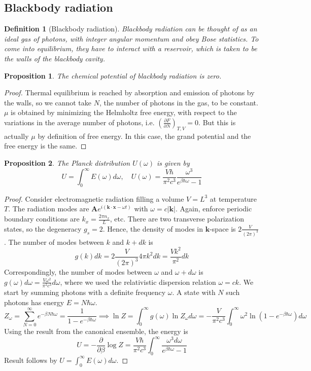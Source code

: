 \documentclass[a4paper]{article}
\theoremstyle{new}
\newtheorem{defi}{Definition}[section]
\newtheorem{prop}{Proposition}[section]
\begin{document}
\subsection{Blackbody radiation}
\begin{defi}[Blackbody radiation]
Blackbody radiation can be thought of as an ideal gas of photons, with integer angular momentum and obey Bose statistics. To come into equilibrium, they have to interact with a reservoir, which is taken to be the walls of the blackbody cavity.
\end{defi}
\begin{prop}
The chemical potential of blackbody radiation is zero.
\end{prop}
\begin{proof}
Thermal equilibrium is reached by absorption and emission of photons by the walls, so we cannot take $N$, the number of photons in the gas, to be constant. $\mu$ is obtained by minimizing the Helmholtz free energy, with respect to the variations in the average number of photons, i.e. $(\frac{\partial F}{\partial N})_{T,V}=0$. But this is actually $\mu$ by definition of free energy. In this case, the grand potential and the free energy is the same.
\end{proof}
\begin{prop}
The Planck distribution $U(\omega)$ is given by
\begin{equation}
U=\int_0^\infty E(\omega)d\omega,\quad U(\omega)=\frac{V\hbar}{\pi^2c^3}\frac{\omega^3}{e^{\beta\hbar\omega}-1}\label{Planck}
\end{equation}
\end{prop}
\begin{proof}
Consider electromagnetic radiation filling a volume $V=L^3$ at temperature $T$. The radiation modes are $\mathbf{A}e^{i(\mathbf{k}\cdot\mathbf{x}-\omega t)}$ with $\omega=c|\mathbf{k}|$. Again, enforce periodic boundary conditions are $k_x=\frac{2\pi n_x}{L}$, etc. There are two transverse polarization states, so the degeneracy $g_s=2$. Hence, the density of modes in $\mathbf{k}$-space is $2\frac{V}{(2\pi)^3}$. The number of modes between $k$ and $k+dk$ is 
$$g(k)dk=2\frac{V}{(2\pi)^3}4\pi k^2dk=\frac{Vk^2}{\pi^2}dk$$
Correspondingly, the number of modes between $\omega$ and $\omega+d\omega$ is $g(\omega)d\omega=\frac{V\omega^2}{\pi^2c^3}d\omega$, where we used the relativistic dispersion relation $\omega=ck$. We start by summing photons with a definite frequency $\omega$. A state with $N$ such photons has energy $E=N\hbar\omega$.
$$Z_\omega=\sum_{N=0}^\infty e^{-\beta N\hbar\omega}=\frac{1}{1-e^{-\beta\hbar\omega}}\implies\ln Z=\int_0^\infty g(\omega)\ln Z_\omega d\omega=-\frac{V}{\pi^2c^3}\int_0^\infty\omega^2\ln(1-e^{-\beta\hbar\omega})d\omega$$
Using the result from the canonical ensemble, the energy is
$$U=-\frac{\partial}{\partial\beta}\log Z=\frac{V\hbar}{\pi^2c^3}\int_0^\infty\frac{\omega^3d\omega}{e^{\beta\hbar\omega}-1}$$
Result follows by $U=\int_0^\infty E(\omega)d\omega$.
\end{proof}
\end{document}
